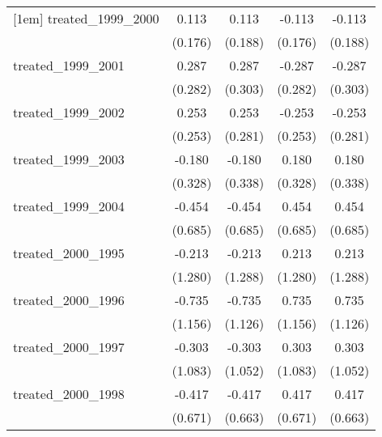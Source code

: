 {\begin{tabular}{l*{4}{c}}
[1em]
treated\_1999\_2000&       0.113         &       0.113         &      -0.113         &      -0.113         \\
            &     (0.176)         &     (0.188)         &     (0.176)         &     (0.188)         \\
[1em]
treated\_1999\_2001&       0.287         &       0.287         &      -0.287         &      -0.287         \\
            &     (0.282)         &     (0.303)         &     (0.282)         &     (0.303)         \\
[1em]
treated\_1999\_2002&       0.253         &       0.253         &      -0.253         &      -0.253         \\
            &     (0.253)         &     (0.281)         &     (0.253)         &     (0.281)         \\
[1em]
treated\_1999\_2003&      -0.180         &      -0.180         &       0.180         &       0.180         \\
            &     (0.328)         &     (0.338)         &     (0.328)         &     (0.338)         \\
[1em]
treated\_1999\_2004&      -0.454         &      -0.454         &       0.454         &       0.454         \\
            &     (0.685)         &     (0.685)         &     (0.685)         &     (0.685)         \\
[1em]
treated\_2000\_1995&      -0.213         &      -0.213         &       0.213         &       0.213         \\
            &     (1.280)         &     (1.288)         &     (1.280)         &     (1.288)         \\
[1em]
treated\_2000\_1996&      -0.735         &      -0.735         &       0.735         &       0.735         \\
            &     (1.156)         &     (1.126)         &     (1.156)         &     (1.126)         \\
[1em]
treated\_2000\_1997&      -0.303         &      -0.303         &       0.303         &       0.303         \\
            &     (1.083)         &     (1.052)         &     (1.083)         &     (1.052)         \\
[1em]
treated\_2000\_1998&      -0.417         &      -0.417         &       0.417         &       0.417         \\
            &     (0.671)         &     (0.663)         &     (0.671)         &     (0.663)         \\

\end{tabular}}

